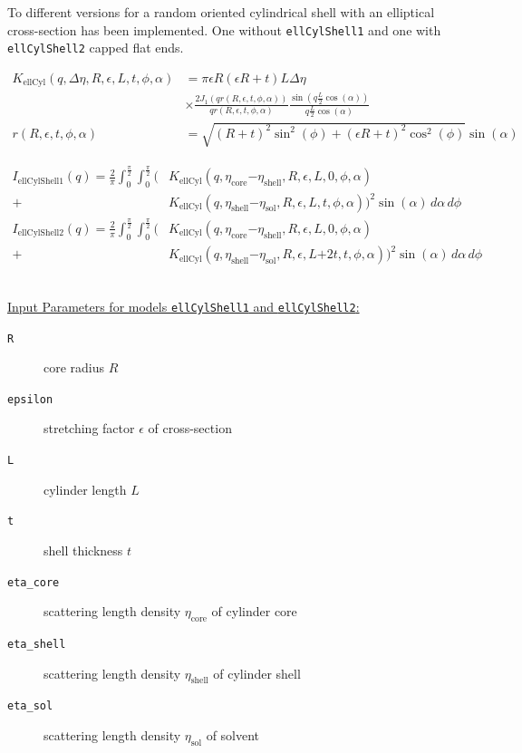 To different versions for a random oriented cylindrical shell with
an elliptical cross-section has been implemented. One without
\texttt{ellCylShell1} and one with \texttt{ellCylShell2} capped flat
ends.

\begin{align}
K_\text{ellCyl}(q,\Delta\eta,R,\epsilon,L,t,\phi,\alpha) &= \pi \epsilon R(\epsilon R+t) L
\Delta \eta \\
    & \times \frac{2J_1\left(q r(R,\epsilon,t,\phi,\alpha) \right)}{q r(R,\epsilon,t,\phi,\alpha)}
    \frac{\sin(q \frac{L}{2}\cos(\alpha))}{q\frac{L}{2}\cos(\alpha)} \nonumber \\
r(R,\epsilon,t,\phi,\alpha) &= \sqrt{(R+t)^2\sin^2(\phi)+(\epsilon R+t)^2\cos^2(\phi)} \sin(\alpha)
\end{align}

\begin{align}
I_\text{ellCylShell1}(q) = \frac{2}{\pi}\int_0^{\frac{\pi}{2}} \!\! \int_0^{\frac{\pi}{2}} \biggl(
  &
  K_\text{ellCyl}\left(q,\eta_\text{core}\mathord-\eta_\text{shell},R,\epsilon,L,0,\phi,\alpha\right) \\
+&  K_\text{ellCyl}\left(q,\eta_\text{shell}\mathord-\eta_\text{sol},R,\epsilon,L,t,\phi,\alpha\right)
\biggr)^2 \sin(\alpha) \,d\alpha\, d\phi \nonumber \\
I_\text{ellCylShell2}(q) = \frac{2}{\pi}\int_0^{\frac{\pi}{2}} \!\!  \int_0^{\frac{\pi}{2}}  \biggl(
 &  K_\text{ellCyl}\left(q,\eta_\text{core}\mathord-\eta_\text{shell},R,\epsilon,L,0,\phi,\alpha\right) \\
+&  K_\text{ellCyl}\left(q,\eta_\text{shell}\mathord-\eta_\text{sol},R,\epsilon,L\mathord+2t,t,\phi,\alpha\right) \biggr)^2 \sin(\alpha) \,d\alpha \,d\phi  \nonumber
\end{align}


\vspace{5mm}

\hspace{1pt}\\
\uline{Input Parameters for models \texttt{ellCylShell1} and \texttt{ellCylShell2}:}\\
\begin{description}
\item[\texttt{R}] core radius $R$
\item[\texttt{epsilon}] stretching factor $\epsilon$ of cross-section
\item[\texttt{L}] cylinder length $L$
\item[\texttt{t}] shell thickness $t$
\item[\texttt{eta\_core}] scattering length density $\eta_\text{core}$ of cylinder core
\item[\texttt{eta\_shell}] scattering length density $\eta_\text{shell}$ of cylinder shell
\item[\texttt{eta\_sol}] scattering length density $\eta_\text{sol}$ of solvent
\end{description}


